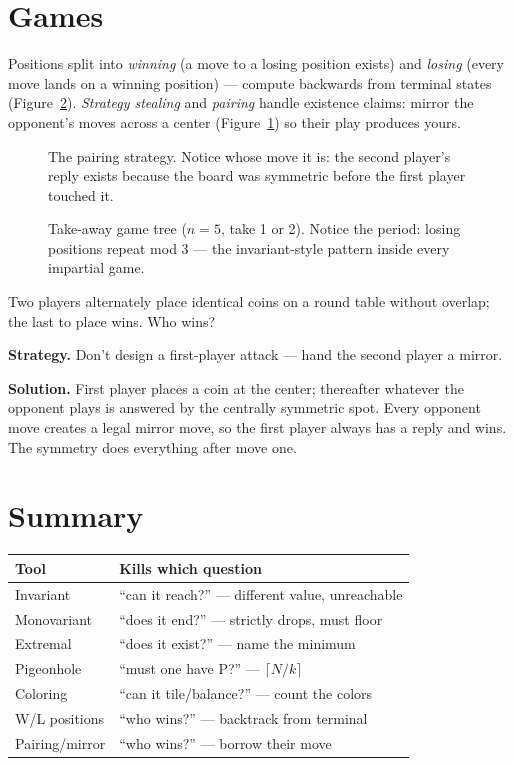 \section{Games}
Positions split into \emph{winning} (a move to a losing position
exists) and \emph{losing} (every move lands on a winning position) ---
compute backwards from terminal states (Figure~\ref{fig:nim}).
\emph{Strategy stealing} and \emph{pairing} handle existence claims:
mirror the opponent's moves across a center (Figure~\ref{fig:pair}) so
their play produces yours.
\begin{figure}[ht]\centering

\caption{The pairing strategy. Notice whose move it is: the second
player's reply exists because the board was symmetric before the first
player touched it.}
\label{fig:pair}
\end{figure}
\begin{figure}[ht]\centering

\caption{Take-away game tree ($n=5$, take 1 or 2). Notice the period:
losing positions repeat mod 3 --- the invariant-style pattern inside
every impartial game.}
\label{fig:nim}
\end{figure}
\begin{example}
Two players alternately place identical coins on a round table without
overlap; the last to place wins. Who wins?

\textbf{Strategy.} Don't design a first-player attack --- hand the
second player a mirror.

\textbf{Solution.} First player places a coin at the center; thereafter
whatever the opponent plays is answered by the centrally symmetric
spot. Every opponent move creates a legal mirror move, so the first
player always has a reply and wins. The symmetry does everything after
move one.
\end{example}

\section{Summary}
\begin{center}\small
\begin{tabular}{@{}ll@{}}
\toprule
\textbf{Tool} & \textbf{Kills which question} \\
\midrule
Invariant & ``can it reach?'' --- different value, unreachable \\
Monovariant & ``does it end?'' --- strictly drops, must floor \\
Extremal & ``does it exist?'' --- name the minimum \\
Pigeonhole & ``must one have P?'' --- $\lceil N/k\rceil$ \\
Coloring & ``can it tile/balance?'' --- count the colors \\
W/L positions & ``who wins?'' --- backtrack from terminal \\
Pairing/mirror & ``who wins?'' --- borrow their move \\
\bottomrule
\end{tabular}
\end{center}

